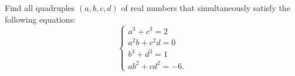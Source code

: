 Find all quadruples $(a, b, c, d)$ of real numbers that simultaneously satisfy the following equations:$$\begin{cases} a^3 + c^3 = 2 \\ a^2b + c^2d = 0 \\ b^3 + d^3 = 1 \\ ab^2 + cd^2 = -6.\end{cases}$$